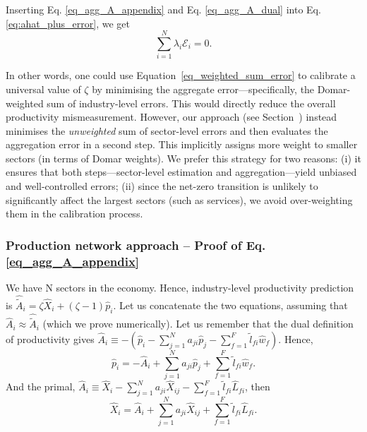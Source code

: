 \documentclass[11pt]{article}
\begin{document}
Inserting Eq. \eqref{eq_agg_A_appendix} and Eq. \eqref{eq_agg_A_dual} into Eq. \eqref{eq:ahat_plus_error}, we get
\begin{equation}
\label{eq_weighted_sum_error}
    \sum_{i=1}^N \lambda_i \mathcal{E}_i = 0.
\end{equation}

In other words, one could use Equation~\ref{eq_weighted_sum_error} to calibrate a universal value of $\zeta$ by minimising the aggregate error—specifically, the Domar-weighted sum of industry-level errors. This would directly reduce the overall productivity mismeasurement. However, our approach (see Section~) instead minimises the \emph{unweighted} sum of sector-level errors and then evaluates the aggregation error in a second step. This implicitly assigns more weight to smaller sectors (in terms of Domar weights). We prefer this strategy for two reasons:
(i) it ensures that both steps—sector-level estimation and aggregation—yield unbiased and well-controlled errors;
(ii) since the net-zero transition is unlikely to significantly affect the largest sectors (such as services), we avoid over-weighting them in the calibration process.

\subsubsection{Production network approach -- Proof of Eq. \eqref{eq_agg_A_appendix}}
\label{section_production_network_approach}

We have N sectors in the economy. Hence, industry-level productivity prediction is $\hat{\tilde{A}}_i = \zeta\hat{X}_i+(\zeta - 1) \hat{p}_i$.
Let us concatenate the two equations, assuming that $\hat{A}_i\approx \hat{\tilde{A}}_i$ (which we prove numerically). Let us remember that the dual definition of productivity gives $\hat{A}_i \equiv  - \left( \hat{p}_i - \sum_{j=1}^N  a_{ji} \hat{p}_j - \sum_{f=1}^F \tilde{l}_{fi} \hat{w}_f \right)$.
Hence,
\begin{equation*}
     \hat{p}_i=-\hat{A}_i + \sum_{j=1}^N  a_{ji} \hat{p}_j+\sum_{f=1}^F \tilde{l}_{fi} \hat{w}_f.
\end{equation*}
And the primal, $\hat{A}_i \equiv \hat{X}_i - \sum_{j=1}^N  a_{ji} \hat{X}_{ij} - \sum_{f=1}^F \tilde{l}_{fi}\hat{L}_{fi}$, then
\begin{equation*}
     \hat{X}_i=\hat{A}_i + \sum_{j=1}^N  a_{ji} \hat{X}_{ij} + \sum_{f=1}^F \tilde{l}_{fi}\hat{L}_{fi}.
\end{equation*}
\end{document}
